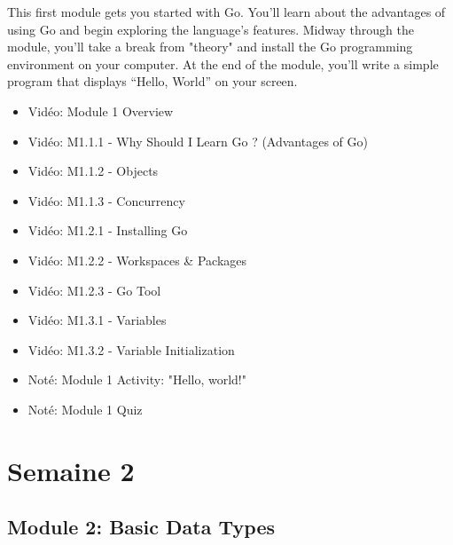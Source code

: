 This first module gets you started with Go. You'll learn about the advantages of using Go and begin exploring the language's features. Midway through the module, you’ll take a break from "theory" and install the Go programming environment on your computer. At the end of the module, you'll write a simple program that displays “Hello, World” on your screen.
\begin{multicols}{2}
\begin{itemize}[label={$\bullet$}]
  \item Vidéo: Module 1 Overview
  \item Vidéo: M1.1.1 - Why Should I Learn Go ? (Advantages of Go)
  \item Vidéo: M1.1.2 - Objects
  \item Vidéo: M1.1.3 - Concurrency
  \item Vidéo: M1.2.1 - Installing Go
  \item Vidéo: M1.2.2 - Workspaces \& Packages
  \item Vidéo: M1.2.3 - Go Tool
  \item Vidéo: M1.3.1 - Variables
  \item Vidéo: M1.3.2 - Variable Initialization
  \item Noté: Module 1 Activity: "Hello, world!"
  \item Noté: Module 1 Quiz
\end{itemize}    
\end{multicols}    
\section*{Semaine 2}

\subsection*{Module 2: Basic Data Types}

